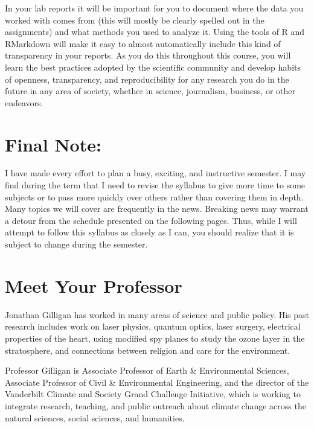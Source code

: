 \documentclass[11pt,twoside]{jgsyllabus}\usepackage[]{graphicx}\usepackage[]{color}
\begin{document}
In your lab reports it will be important for you to document where the data you
worked with comes from (this will mostly be clearly spelled out in the
assignments) and what methods you used to analyze it. Using the tools of R and
RMarkdown will make it easy to almost automatically include this kind of
transparency in your reports. As you do this throughout this course, you will
learn the best practices adopted by the scientific community and develop habits
of openness, transparency, and reproducibility for any research you do in the
future in any area of society, whether in science, journalism, business, or
other endeavors.

\section{Final Note:}
I have made every effort to plan a busy, exciting, and instructive semester.
I may find during the term that I need to revise the syllabus to give more time
to some subjects or to pass more quickly over others rather than covering them
in depth. Many topics we will cover are frequently in the news. Breaking news
may warrant a detour from the schedule presented on the following pages.
Thus, while I will attempt to follow this syllabus as closely as I can,
you should realize that it is subject to change during the semester.

\clearpage
\section{Meet Your Professor}
Jonathan Gilligan has worked in many areas of science and public policy.
His past research includes work on laser physics, quantum optics,
laser surgery, electrical properties of the heart, using modified spy planes to
study the ozone layer in the stratosphere, and connections between religion and
care for the environment.
\iffalse

Professor Gilligan joined the Vanderbilt Faculty in 1994 as a member of the
Department of Physics and Astronomy. In 2003, when the Department of Geology
became the Department of Earth and Environmental Science, Professor Gilligan
joined the new department to focus on atmospheric science, global climate change,
and the interactions of politics, ethics, religion, communication, and the
environment.
\fi

Professor Gilligan is Associate Professor of Earth \& Environmental Sciences,
Associate Professor of Civil \& Environmental Engineering, and
the director of the Vanderbilt Climate and Society Grand Challenge Initiative,
which is working to integrate research, teaching, and public outreach about
climate change across the natural sciences, social sciences, and humanities.
\end{document}
